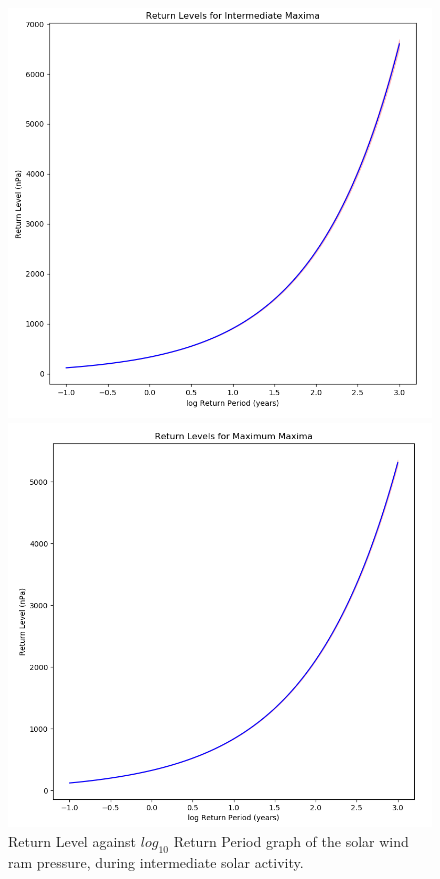 \documentclass[12pt]{article}
\begin{document}
        \begin{figure}[t!]
            \begin{minipage}{0.48\textwidth}
                \centering
                \includegraphics[width=\textwidth]{fig_method/PintmaxReturn.png}
                \caption{Return Level against $log_{10}$ Return Period graph of the solar wind ram pressure, during intermediate solar activity.}
                \label{fig:PintmaxReturn}
            \end{minipage}
            \hfill
            \begin{minipage}{0.48\textwidth}
                \centering
                \includegraphics[width=\textwidth]{fig_method/PmaxmaxReturn.png}

\end{minipage}
\end{figure}
\end{document}
